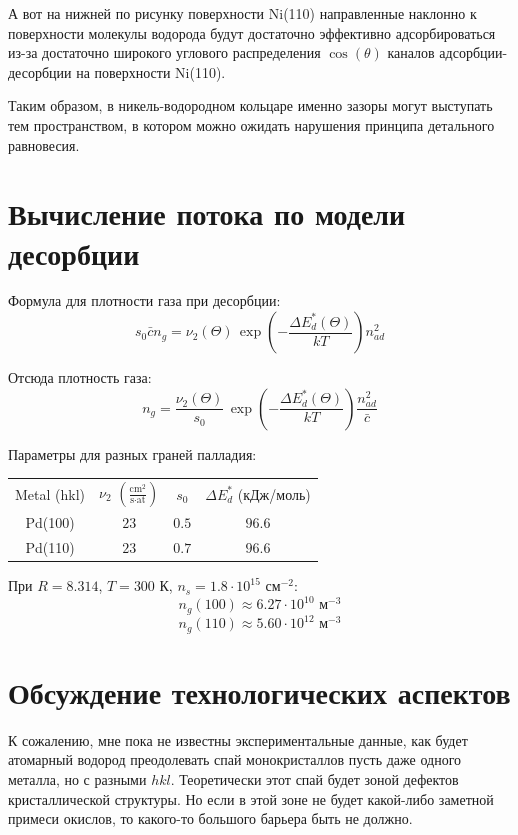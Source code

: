 \documentclass[11pt,a4paper]{article}
\begin{document}
А вот на нижней по рисунку поверхности Ni(110) направленные наклонно к поверхности молекулы водорода будут достаточно эффективно адсорбироваться из-за достаточно широкого углового распределения $\cos(\theta)$ каналов адсорбции-десорбции на поверхности Ni(110).

Таким образом, в никель-водородном кольцаре именно зазоры могут выступать тем пространством, в котором можно ожидать нарушения принципа детального равновесия.

\section{Вычисление потока по модели десорбции}

Формула для плотности газа при десорбции:
\[
s_0 \bar{c} n_g = \nu_2 (\Theta) \, \exp \left(-\frac{\Delta E^{*}_{d} (\Theta)}{kT} \right) n_{ad}^2
\]

Отсюда плотность газа:
\[
n_g = \frac{\nu_2 (\Theta)}{s_0} \, \exp \left(-\frac{\Delta E^{*}_{d} (\Theta)}{kT} \right) \frac{n_{ad}^2}{\bar{c}}
\]

Параметры для разных граней палладия:
\begin{center}
\begin{tabular}{cccc}
Metal (hkl) & $\nu_2$ $\left(\frac{\text{cm}^2}{\text{s}\cdot\text{at}}\right)$ & $s_0$ & $\Delta E^{*}_{d}$ (кДж/моль) \\
Pd(100) & $23$ & $0.5$ & $96.6$ \\
Pd(110) & $23$ & $0.7$ & $96.6$ \\
\end{tabular}
\end{center}

При $R = 8.314$, $T = 300$ К, $n_s = 1.8 \cdot 10^{15}$ см$^{-2}$:
\[
n_g(100) \approx 6.27 \cdot 10^{10} \text{ м}^{-3}
\]
\[
n_g(110) \approx 5.60 \cdot 10^{12} \text{ м}^{-3}
\]

\section{Обсуждение технологических аспектов}

К сожалению, мне пока не известны экспериментальные данные, как будет атомарный водород преодолевать спай монокристаллов пусть даже одного металла, но с разными $hkl$. Теоретически этот спай будет зоной дефектов кристаллической структуры. Но если в этой зоне не будет какой-либо заметной примеси окислов, то какого-то большого барьера быть не должно.
\end{document}
